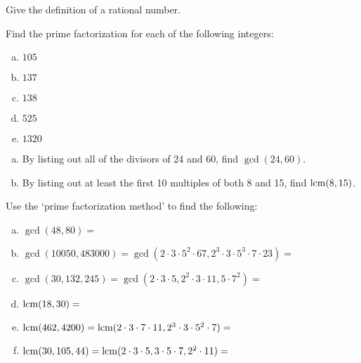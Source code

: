 \documentclass[11pt,letterpaper]{article}
\begin{document}

 Give the definition of a rational number. 



\vfill



 Find the prime factorization for each of the following integers: 
\begin{enumerate}[(a)]
\item $105$ \vfill
\item $137$ \vfill
\item $138$ \vfill
\item $525$ \vfill
\item $1320$ \vfill
\end{enumerate}



\newpage



\begin{enumerate}[(a)]
\item By listing out all of the divisors of $24$ and $60$, find $\gcd(24, 60)$. \vspace{5cm} 

\item By listing out at least the first 10 multiples of both 8 and 15, find $\operatorname{lcm}(8, 15)$. 
\end{enumerate} \vspace{5cm}





 Use the `prime factorization method' to find the following: \pspace
\begin{enumerate}[(a)]
\item $\gcd(48, 80)=$ \vfill
\item $\gcd(10050, 483000)= \gcd(2 \cdot 3 \cdot 5^2 \cdot 67, 2^3 \cdot 3 \cdot 5^3 \cdot 7 \cdot 23)=$ \vfill
\item $\gcd(30, 132, 245)= \gcd(2 \cdot 3 \cdot 5, 2^2 \cdot 3 \cdot 11, 5 \cdot 7^2)=$ \vfill
\item $\operatorname{lcm}(18,30)=$ \vfill
\item $\operatorname{lcm}(462,4200)= \operatorname{lcm}(2 \cdot 3 \cdot 7 \cdot 11, 2^3 \cdot 3 \cdot 5^2 \cdot 7)=$ \vfill
\item $\operatorname{lcm}(30, 105, 44)= \operatorname{lcm}(2 \cdot 3 \cdot 5, 3 \cdot 5 \cdot 7, 2^2 \cdot 11)=$ \vfill
\end{enumerate}
\end{document}
